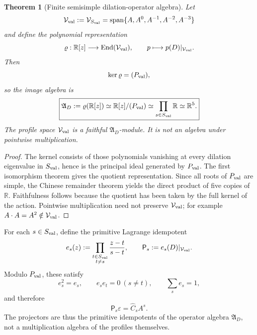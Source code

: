 \documentclass[11pt,a4paper]{article}
\def\Dil{D}%
\numberwithin{equation}{section}
\theoremstyle{definition}
\theoremstyle{plain}
\newtheorem{theorem}[criterion]{Theorem}
\theoremstyle{remark}
\newcommand{\Dil}{\mathscr{D}}
\begin{document}
\begin{theorem}[Finite semisimple dilation-operator algebra]
Let
\begin{equation}
\mathcal V_{\rm val}:=\mathcal V_{S_{\rm val}}
=\operatorname{span}\{A,A^0,A^{-1},A^{-2},A^{-3}\}
\end{equation}
and define the polynomial representation
\begin{equation}
\varrho:\mathbb R[z]\longrightarrow\operatorname{End}(\mathcal V_{\rm val}),
\qquad
p\longmapsto p(\Dil)|_{\mathcal V_{\rm val}}.
\end{equation}
Then
\begin{equation}
\ker\varrho=(P_{\rm val}),
\end{equation}
so the image algebra is
\begin{equation}
\boxed{
\mathfrak A_{\Dil}
:=\varrho(\mathbb R[z])
\simeq\mathbb R[z]/(P_{\rm val})
\simeq\prod_{s\in S_{\rm val}}\mathbb R
\simeq\mathbb R^5.
}
\end{equation}
The profile space \(\mathcal V_{\rm val}\) is a faithful \(\mathfrak A_{\Dil}\)-module. It is not an algebra under pointwise multiplication.
\end{theorem}
\begin{proof}
The kernel consists of those polynomials vanishing at every dilation eigenvalue in \(S_{\rm val}\), hence is the principal ideal generated by \(P_{\rm val}\). The first isomorphism theorem gives the quotient representation. Since all roots of \(P_{\rm val}\) are simple, the Chinese remainder theorem yields the direct product of five copies of \(\mathbb R\). Faithfulness follows because the quotient has been taken by the full kernel of the action. Pointwise multiplication need not preserve \(\mathcal V_{\rm val}\); for example \(A\cdot A=A^2\notin\mathcal V_{\rm val}\).
\end{proof}

For each \(s\in S_{\rm val}\), define the primitive Lagrange idempotent
\begin{equation}
e_s(z)
:=\prod_{\substack{t\in S_{\rm val}\\t\neq s}}
\frac{z-t}{s-t},
\qquad
\mathsf P_s:=e_s(\Dil)|_{\mathcal V_{\rm val}}.
\end{equation}
Modulo \(P_{\rm val}\), these satisfy
\begin{equation}
e_s^2=e_s,
\qquad
e_se_t=0\ (s\neq t),
\qquad
\sum_s e_s=1,
\end{equation}
and therefore
\begin{equation}
\mathsf P_s\varepsilon=\widehat C_s A^s.
\end{equation}
The projectors are thus the primitive idempotents of the operator algebra \(\mathfrak A_{\Dil}\), not a multiplication algebra of the profiles themselves.
\end{document}
